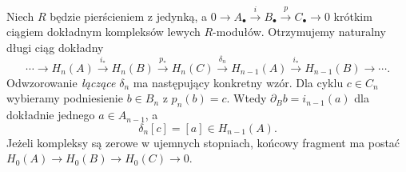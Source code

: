 \begin{twierdzenie}
\label{thm:les-homologia}
Niech $R$ będzie pierścieniem z jedynką, a
$0\to A_\bullet\xrightarrow{i}B_\bullet
\xrightarrow{p}C_\bullet\to0$
krótkim ciągiem dokładnym kompleksów lewych
$R$-modułów. Otrzymujemy naturalny długi ciąg dokładny
\begin{equation}\label{eq:les-homologia}
 \cdots\longrightarrow H_n(A)
 \xrightarrow{i_*}H_n(B)
 \xrightarrow{p_*}H_n(C)
 \xrightarrow{\delta_n}H_{n-1}(A)
 \xrightarrow{i_*}H_{n-1}(B)
 \longrightarrow\cdots.
\end{equation}
Odwzorowanie \emph{łączące} $\delta_n$ ma następujący
konkretny wzór. Dla cyklu $c\in C_n$ wybieramy
podniesienie $b\in B_n$ z $p_n(b)=c$.
Wtedy $\partial_B b=i_{n-1}(a)$ dla dokładnie
jednego $a\in A_{n-1}$, a
\begin{equation}\label{eq:delta-wzor}
 \delta_n[c]=[a]\in H_{n-1}(A).
\end{equation}
Jeżeli kompleksy są zerowe w ujemnych stopniach,
końcowy fragment ma postać
$H_0(A)\to H_0(B)\to H_0(C)\to0$.
\end{twierdzenie}
